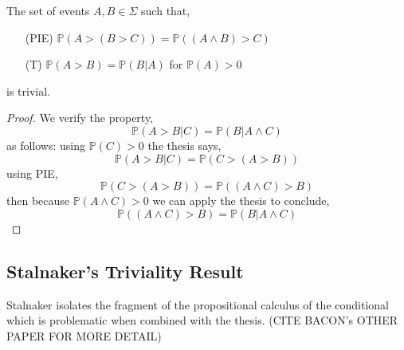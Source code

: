 \documentclass[12pt]{article}
\renewcommand{\P}{\mathbb{P}}
\begin{document}
\begin{prop}[Fitelson] 
The set of events $A, B \in \Sigma$ such that,
\begin{enumerate}
\item[(PIE)] $\P(A > (B > C)) = \P((A \wedge B) > C)$
\item[(T)] $\P(A > B) = \P(B|A)$ for $\P(A) > 0$
\end{enumerate}
is trivial.
\end{prop}

\begin{proof}
We verify the property,
\[ \P(A > B | C) = \P(B | A \wedge C) \]
as follows: using $\P(C) > 0$ the thesis says,
\[ \P(A > B | C) = \P(C > (A > B)) \]
using PIE,
\[ \P(C > (A > B)) = \P((A \wedge C) > B) \]
then because $\P(A \wedge C) > 0$ we can apply the thesis to conclude,
\[ \P((A \wedge C) > B) = \P(B | A \wedge C) \]
\end{proof}

\subsection{Stalnaker's Triviality Result}

\begin{rmk}
Stalnaker isolates the fragment of the propositional calculus of the conditional which is problematic when combined with the thesis. (CITE BACON's OTHER PAPER FOR MORE DETAIL)
\end{rmk}
\end{document}
